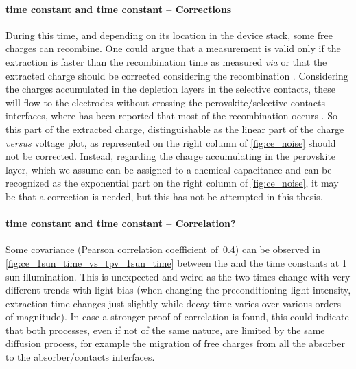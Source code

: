 		\paragraph{ time constant and  time constant -- Corrections}\label{characterization_ce_correction}
		During this time, and depending on its location in the device stack, some free charges can recombine.
		One could argue that a  measurement is valid only if the extraction is faster than the recombination time as measured \textsl{via}  \cite{Ryan2017a} or that the extracted charge should be corrected considering the recombination \cite{Credgington2011,Credgington2014}.
		Considering the charges accumulated in the depletion layers in the selective contacts, these will flow to the electrodes without crossing the perovskite/selective contacts interfaces, where has been reported that most of the recombination occurs \cite{Barnea-Nehoshtan2014,Stolterfoht2018a,Stolterfoht2018}.
		So this part of the extracted charge, distinguishable as the linear part of the charge \textsl{versus} voltage plot, as represented on the right column of \cref{fig:ce_noise} should not be corrected.
		Instead, regarding the charge accumulating in the perovskite layer, which we assume can be assigned to a chemical capacitance and can be recognized as the exponential part on the right column of \cref{fig:ce_noise}, it may be that a correction \cite{Shuttle2008a,Shuttle2008b} is needed, but this has not be attempted in this thesis.

		\paragraph{ time constant and  time constant -- Correlation?}
		Some covariance (Pearson correlation coefficient of~0.4) can be observed in \cref{fig:ce_1sun_time_vs_tpv_1sun_time} between the  and the  time constants at 1 sun illumination.
		This is unexpected and weird as the two times change with very different trends with light bias (when changing the preconditioning light intensity,  extraction time changes just slightly while  decay time varies over various orders of magnitude).
		In case a stronger proof of correlation is found, this could indicate that both processes, even if not of the same nature, are limited by the same diffusion process, for example the migration of free charges from all the absorber to the absorber/contacts interfaces.

